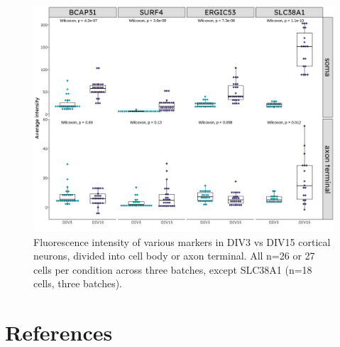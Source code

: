 \documentclass[
  12pt,
  a4paper,
]{book}
\begin{document}
\begin{figure}
\includegraphics{../figures/full/suppl-dev-grid-1} \caption[Supplementary figure; marker intensity in cell bodies and axon terminals of developing cortical neurons]{Fluorescence intensity of various markers in DIV3 vs DIV15 cortical neurons, divided into cell body or axon terminal.  All n=26 or 27 cells per condition across three batches, except SLC38A1 (n=18 cells, three batches).}\label{fig:suppl-dev-grid}
\end{figure}

\hypertarget{BIB}{%
\chapter*{References}\label{BIB}}

\end{document}
